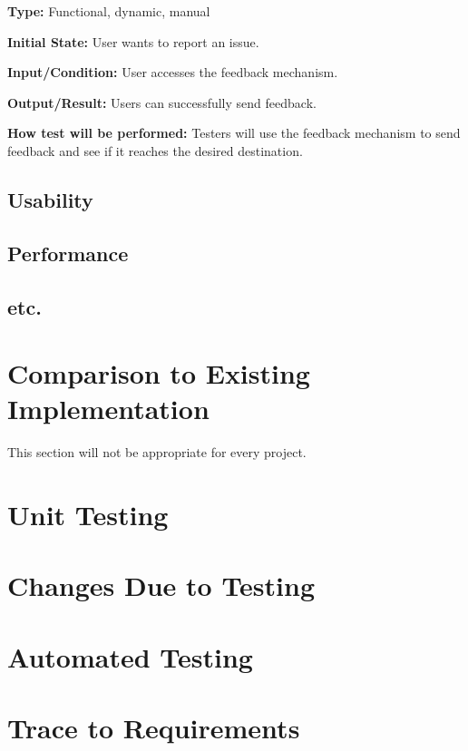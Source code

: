 \documentclass[12pt, titlepage]{article}
\begin{document}
\textbf{Type: }Functional, dynamic, manual

\textbf{Initial State: }User wants to report an issue.

\textbf{Input/Condition: }User accesses the feedback mechanism.

\textbf{Output/Result:} Users can successfully send feedback.

\textbf{How test will be performed: }Testers will use the feedback mechanism to send feedback and see if it reaches the desired destination. 

\subsection{Usability}
		
\subsection{Performance}

\subsection{etc.}
	
\section{Comparison to Existing Implementation}	

This section will not be appropriate for every project.

\section{Unit Testing}

\section{Changes Due to Testing}


\section{Automated Testing}
		
\section{Trace to Requirements}
		
\end{document}
